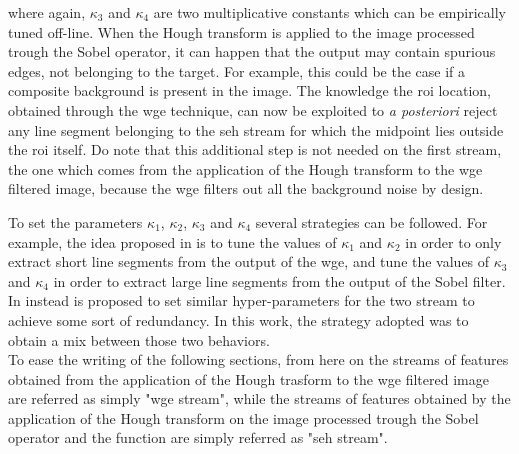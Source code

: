 where again, $\kappa_3$ and $\kappa_4$  are two multiplicative constants which can be empirically tuned off-line. When the Hough transform is applied to the image processed trough the Sobel operator, it can happen that the output may contain spurious edges, not belonging to the target. For example, this could be the case if a composite background is present in the image. The knowledge the \acrshort{roi} location, obtained through the \acrshort{wge} technique, can now be exploited to \textit{a posteriori} reject any line segment belonging to the \acrshort{seh} stream for which the midpoint lies outside the \acrshort{roi} itself. Do note that this additional step is not needed on the first stream, the one which comes from the application of the Hough transform to the \acrshort{wge} filtered image, because the \acrshort{wge} filters out all the background noise by design.

To set the parameters $\kappa_1$, $\kappa_2$, $\kappa_3$ and $\kappa_4$ several strategies can be followed. For example, the idea proposed in \cite{Sharma2018} is to tune the values of $\kappa_1$ and $\kappa_2$ in order to only extract short line segments from the output of the \acrshort{wge}, and tune the values of $\kappa_3$ and $\kappa_4$ in order to extract large line segments from the output of the Sobel filter. In \cite{fracchio2019} instead is proposed to set similar hyper-parameters for the two stream to achieve some sort of redundancy. In this work, the strategy adopted was to obtain a mix between those two behaviors. \\
To ease the writing of the following sections, from here on the streams of features obtained from the application of the Hough trasform to the \acrshort{wge} filtered image are referred as simply "\acrshort{wge} stream", while the streams of features obtained by the application of the Hough transform on the image processed trough the Sobel operator and the  function are simply referred as "\acrshort{seh} stream".

